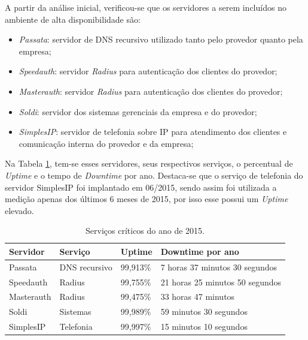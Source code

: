 A partir da análise inicial, verificou-se que os servidores a serem incluídos no ambiente de alta disponibilidade são:
\begin{itemize}
 \item \textit{Passata}: servidor de \ac{DNS} recursivo utilizado tanto pelo provedor quanto pela empresa;
 \item \textit{Speedauth}: servidor \textit{Radius} para autenticação dos clientes do provedor;
 \item \textit{Masterauth}: servidor \textit{Radius} para autenticação dos clientes do provedor;
 \item \textit{Soldi}: servidor dos sistemas gerenciais da empresa e do provedor;
 \item \textit{SimplesIP}: servidor de telefonia sobre \ac{IP} para atendimento dos clientes e comunicação interna do provedor e da empresa;
\end{itemize}

Na Tabela \ref{tab:dispservcrit}, tem-se esses servidores, seus respectivos serviços, o percentual de \textit{Uptime} e o tempo de 
\textit{Downtime} por ano. Destaca-se que o serviço de telefonia do servidor SimplesIP foi implantado em 06/2015, sendo assim foi utilizada a 
medição apenas dos últimos 6 meses de 2015, por isso esse possui um \textit{Uptime} elevado.

\begin{table}[h!]
\caption{Serviços críticos do ano de 2015.}
\label{tab:dispservcrit}
\begin{center}
\begin{tabular}{|l|l|l|l|}\hline
\textbf{Servidor} & \textbf{Serviço} & \textbf{Uptime} & \textbf{Downtime por ano} \\\hline
Passata & DNS recursivo & 99,913\% & 7 horas 37 minutos 30 segundos \\\hline
Speedauth & Radius & 99,755\% & 21 horas 25 minutos 50 segundos \\\hline
Masterauth & Radius & 99,475\% & 33 horas 47 minutos \\\hline
Soldi & Sistemas & 99,989\% & 59 minutos 30 segundos \\\hline
SimplesIP & Telefonia & 99,997\% & 15 minutos 10 segundos \\\hline %
\end{tabular}
\end{center}
\end{table}


